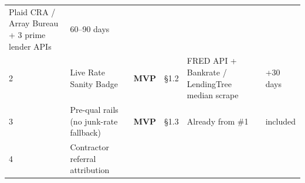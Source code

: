 \documentclass[
  10pt,
]{article}
\begin{document}
\begin{longtable}[]{@{}llllll@{}}
\begin{minipage}[t]{0.14\columnwidth}
Plaid CRA / Array Bureau + 3 prime lender APIs\strut
\end{minipage} & \begin{minipage}[t]{0.14\columnwidth}\raggedright
60--90 days\strut
\end{minipage}\tabularnewline
\begin{minipage}[t]{0.14\columnwidth}\raggedright
2\strut
\end{minipage} & \begin{minipage}[t]{0.14\columnwidth}\raggedright
Live Rate Sanity Badge\strut
\end{minipage} & \begin{minipage}[t]{0.14\columnwidth}\raggedright
\textbf{MVP}\strut
\end{minipage} & \begin{minipage}[t]{0.14\columnwidth}\raggedright
§1.2\strut
\end{minipage} & \begin{minipage}[t]{0.14\columnwidth}\raggedright
FRED API + Bankrate / LendingTree median scrape\strut
\end{minipage} & \begin{minipage}[t]{0.14\columnwidth}\raggedright
+30 days\strut
\end{minipage}\tabularnewline
\begin{minipage}[t]{0.14\columnwidth}\raggedright
3\strut
\end{minipage} & \begin{minipage}[t]{0.14\columnwidth}\raggedright
Pre-qual rails (no junk-rate fallback)\strut
\end{minipage} & \begin{minipage}[t]{0.14\columnwidth}\raggedright
\textbf{MVP}\strut
\end{minipage} & \begin{minipage}[t]{0.14\columnwidth}\raggedright
§1.3\strut
\end{minipage} & \begin{minipage}[t]{0.14\columnwidth}\raggedright
Already from \#1\strut
\end{minipage} & \begin{minipage}[t]{0.14\columnwidth}\raggedright
included\strut
\end{minipage}\tabularnewline
\begin{minipage}[t]{0.14\columnwidth}\raggedright
4\strut
\end{minipage} & \begin{minipage}[t]{0.14\columnwidth}\raggedright
Contractor referral attribution\strut

\end{minipage}
\end{longtable}
\end{document}

